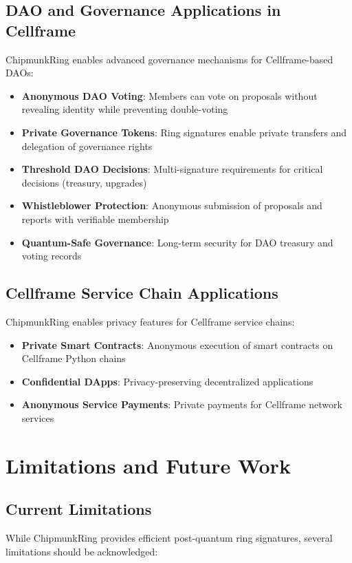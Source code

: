\documentclass[11pt,a4paper]{article}
\begin{document}
\subsection{DAO and Governance Applications in Cellframe}

ChipmunkRing enables advanced governance mechanisms for Cellframe-based DAOs:
\begin{itemize}
\item \textbf{Anonymous DAO Voting}: Members can vote on proposals without revealing identity while preventing double-voting
\item \textbf{Private Governance Tokens}: Ring signatures enable private transfers and delegation of governance rights
\item \textbf{Threshold DAO Decisions}: Multi-signature requirements for critical decisions (treasury, upgrades)
\item \textbf{Whistleblower Protection}: Anonymous submission of proposals and reports with verifiable membership
\item \textbf{Quantum-Safe Governance}: Long-term security for DAO treasury and voting records
\end{itemize}

\subsection{Cellframe Service Chain Applications}

ChipmunkRing enables privacy features for Cellframe service chains:
\begin{itemize}
\item \textbf{Private Smart Contracts}: Anonymous execution of smart contracts on Cellframe Python chains
\item \textbf{Confidential DApps}: Privacy-preserving decentralized applications
\item \textbf{Anonymous Service Payments}: Private payments for Cellframe network services
\end{itemize}

\section{Limitations and Future Work}

\subsection{Current Limitations}

While ChipmunkRing provides efficient post-quantum ring signatures, several limitations should be acknowledged:
\end{document}
